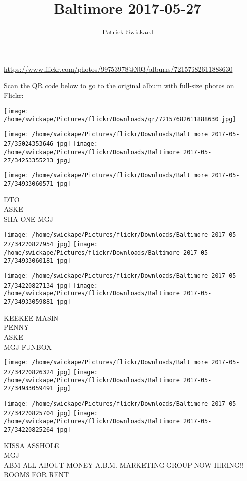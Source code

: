 \documentclass[10pt,letterpaper]{article}
\title{Baltimore 2017-05-27}
\author{Patrick Swickard}
\date{}
\begin{document}
\maketitle

\url{https://www.flickr.com/photos/99753978@N03/albums/72157682611888630}

Scan the QR code below to go to the original album with full-size photos on Flickr:

\texttt{[image: /home/swickape/Pictures/flickr/Downloads/qr/72157682611888630.jpg]}
\pagebreak

\texttt{[image: /home/swickape/Pictures/flickr/Downloads/Baltimore 2017-05-27/35024353646.jpg]}
\texttt{[image: /home/swickape/Pictures/flickr/Downloads/Baltimore 2017-05-27/34253355213.jpg]}

\vspace{0.25in}
\texttt{[image: /home/swickape/Pictures/flickr/Downloads/Baltimore 2017-05-27/34933060571.jpg]}

DTO\\
ASKE\\
SHA ONE MGJ
\pagebreak

\texttt{[image: /home/swickape/Pictures/flickr/Downloads/Baltimore 2017-05-27/34220827954.jpg]}
\texttt{[image: /home/swickape/Pictures/flickr/Downloads/Baltimore 2017-05-27/34933060181.jpg]}

\texttt{[image: /home/swickape/Pictures/flickr/Downloads/Baltimore 2017-05-27/34220827134.jpg]}
\texttt{[image: /home/swickape/Pictures/flickr/Downloads/Baltimore 2017-05-27/34933059881.jpg]}

KEEKEE MASIN\\
PENNY\\
ASKE\\
MGJ FUNBOX
\pagebreak

\texttt{[image: /home/swickape/Pictures/flickr/Downloads/Baltimore 2017-05-27/34220826324.jpg]}
\texttt{[image: /home/swickape/Pictures/flickr/Downloads/Baltimore 2017-05-27/34933059491.jpg]}

\texttt{[image: /home/swickape/Pictures/flickr/Downloads/Baltimore 2017-05-27/34220825704.jpg]}
\texttt{[image: /home/swickape/Pictures/flickr/Downloads/Baltimore 2017-05-27/34220825264.jpg]}

KISSA ASSHOLE\\
MGJ\\
ABM ALL ABOUT MONEY A.B.M. MARKETING GROUP NOW HIRING!!\\
ROOMS FOR RENT
\pagebreak
\end{document}
